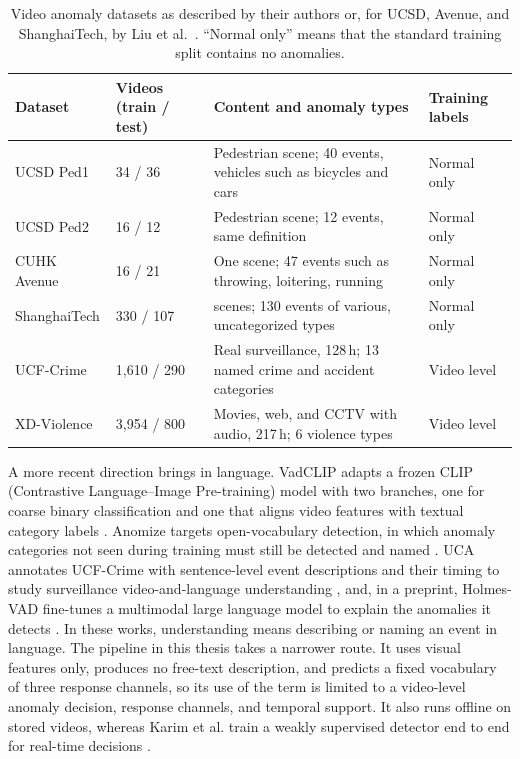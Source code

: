 \begin{table}[!ht]
    \centering
    \small
    \caption[Video anomaly datasets.]{Video anomaly datasets as described by their authors or, for UCSD, Avenue, and ShanghaiTech, by Liu et al.\ \cite{liu2018future}. ``Normal only'' means that the standard training split contains no anomalies.}
    \label{tab:datasets}
    \begin{tabularx}{\textwidth}{@{}l l >{\raggedright\arraybackslash}X l@{}}
        \toprule
        \textbf{Dataset} & \textbf{Videos (train / test)} & \textbf{Content and anomaly types} & \textbf{Training labels} \\
        \midrule
        UCSD Ped1 \cite{mahadevan2010anomaly} & 34 / 36 & Pedestrian scene; 40 events, vehicles such as bicycles and cars & Normal only \\
        UCSD Ped2 \cite{mahadevan2010anomaly} & 16 / 12 & Pedestrian scene; 12 events, same definition & Normal only \\
        CUHK Avenue \cite{lu2013abnormal} & 16 / 21 & One scene; 47 events such as throwing, loitering, running & Normal only \\
        ShanghaiTech \cite{liu2018future} & 330 / 107 & 13 scenes; 130 events of various, uncategorized types & Normal only \\
        UCF-Crime \cite{sultani2018real} & 1,610 / 290 & Real surveillance, 128\,h; 13 named crime and accident categories & Video level \\
        XD-Violence \cite{wu2020not} & 3,954 / 800 & Movies, web, and CCTV with audio, 217\,h; 6 violence types & Video level \\
        \bottomrule
    \end{tabularx}
\end{table}

A more recent direction brings in language. VadCLIP adapts a frozen CLIP
(Contrastive Language--Image Pre-training) model
with two branches, one for coarse binary classification and one that aligns
video features with textual category labels \cite{wu2024vadclip}. Anomize
targets open-vocabulary detection, in which anomaly categories not seen during
training must still be detected and named \cite{anomize2025cvpr}. UCA annotates
UCF-Crime with sentence-level event descriptions and their timing to study
surveillance video-and-language understanding \cite{yuan2024surveillance}, and, in a preprint,
Holmes-VAD fine-tunes a multimodal large language model to explain the
anomalies it detects \cite{zhang2024holmes}. In these works, understanding
means describing or naming an event in language. The pipeline in this thesis
takes a narrower route. It uses visual features only, produces no free-text
description, and predicts a fixed vocabulary of three response channels, so its
use of the term is limited to a video-level anomaly decision, response
channels, and temporal support. It also runs offline on stored videos, whereas
Karim et al. train a weakly supervised detector end to end for real-time
decisions \cite{realtime2024wacv}.

